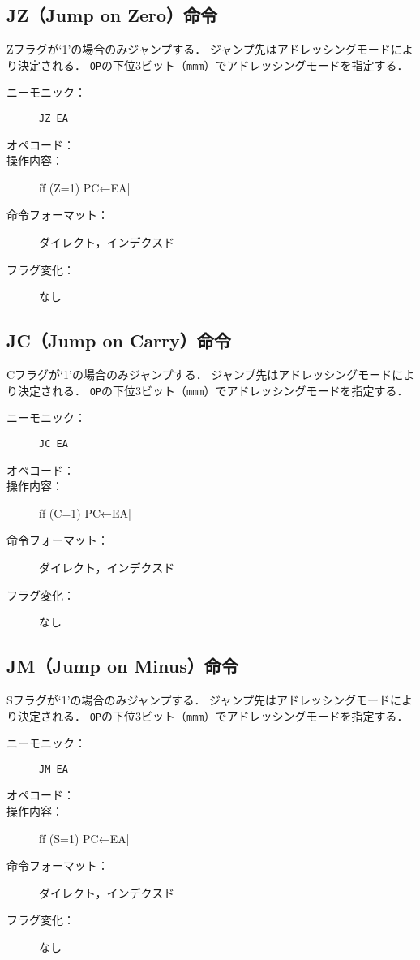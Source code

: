 \subsection{JZ（Jump on Zero）命令}
Zフラグが`1'の場合のみジャンプする．
ジャンプ先はアドレッシングモードにより決定される．
\texttt{OP}の下位3ビット（\texttt{mmm}）でアドレッシングモードを指定する．

\begin{description}
\item[ニーモニック：] \texttt{JZ EA}
\item[オペコード：] 
\item[操作内容：] \|if (Z=1) PC←EA|
\item[命令フォーマット：] ダイレクト，インデクスド
\item[フラグ変化：] なし
\end{description}

\subsection{JC（Jump on Carry）命令}
Cフラグが`1'の場合のみジャンプする．
ジャンプ先はアドレッシングモードにより決定される．
\texttt{OP}の下位3ビット（\texttt{mmm}）でアドレッシングモードを指定する．

\begin{description}
\item[ニーモニック：] \texttt{JC EA}
\item[オペコード：] 
\item[操作内容：] \|if (C=1) PC←EA|
\item[命令フォーマット：] ダイレクト，インデクスド
\item[フラグ変化：] なし
\end{description}

\subsection{JM（Jump on Minus）命令}
Sフラグが`1'の場合のみジャンプする．
ジャンプ先はアドレッシングモードにより決定される．
\texttt{OP}の下位3ビット（\texttt{mmm}）でアドレッシングモードを指定する．

\begin{description}
\item[ニーモニック：] \texttt{JM EA}
\item[オペコード：] 
\item[操作内容：] \|if (S=1) PC←EA|
\item[命令フォーマット：] ダイレクト，インデクスド
\item[フラグ変化：] なし
\end{description}


